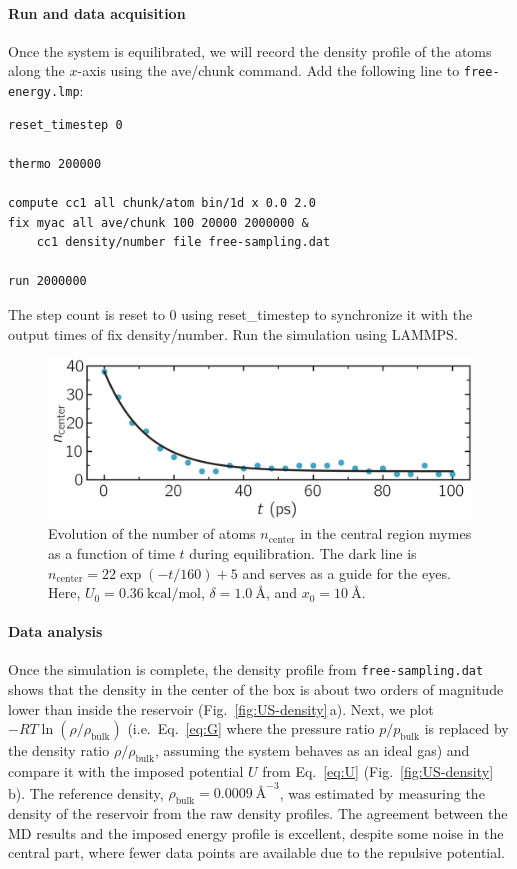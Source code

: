 \documentclass[9pt,tutorial]{livecoms}
\newcommand{\lmpcmd}[1]{\hspace{0pt}\colorbox{listing}{\textcolor{command}{\small{#1}}}\hspace{0pt}} %
\newcommand{\flecmd}[1]{\textcolor{command}{\texttt{#1}}} %
\begin{document}
\paragraph{Run and data acquisition}

Once the system is equilibrated, we will record the density profile of
the atoms along the $x$-axis using the \lmpcmd{ave/chunk} command.
Add the following line to \flecmd{free-energy.lmp}:
\begin{lstlisting}
reset_timestep 0

thermo 200000

compute cc1 all chunk/atom bin/1d x 0.0 2.0
fix myac all ave/chunk 100 20000 2000000 &
    cc1 density/number file free-sampling.dat

run 2000000
\end{lstlisting}
The step count is reset to 0 using \lmpcmd{reset\_timestep} to synchronize it
with the output times of \lmpcmd{fix density/number}.  Run the simulation using
LAMMPS.

\begin{figure}
\centering
\includegraphics[width=\linewidth]{US-density-evolution}
\caption{Evolution of the number of atoms $n_\text{center}$ in the central
region \lmpcmd{mymes} as a function of time $t$ during equilibration.  The dark line
is $n_\text{center} = 22 \exp(-t/160)+5$ and serves as a guide for the eyes.
Here, $U_0 = 0.36~\text{kcal/mol}$, $\delta = 1.0~\text{\AA{}}$, and $x_0 = 10~\text{\AA{}}$.}
\label{fig:US-density-evolution}
\end{figure}

\paragraph{Data analysis}

Once the simulation is complete, the density profile from \flecmd{free-sampling.dat}
shows that the density in the center of the box is
about two orders of magnitude lower than inside the reservoir (Fig.~\ref{fig:US-density}\,a).
Next, we plot $-R T \ln(\rho/\rho_\mathrm{bulk})$ (i.e.~Eq.~\eqref{eq:G} where
the pressure ratio $p/p_\mathrm{bulk}$ is replaced by the density ratio
$\rho/\rho_\mathrm{bulk}$, assuming the system behaves as an ideal gas) and compare it
with the imposed potential $U$ from Eq.~\eqref{eq:U} (Fig.~\ref{fig:US-density}\,b).
The reference density, $\rho_\text{bulk} = 0.0009~\text{\AA{}}^{-3}$,
was estimated by measuring the density of the reservoir from the raw density
profiles.  The agreement between the MD results and the imposed energy profile
is excellent, despite some noise in the central part, where fewer data points
are available due to the repulsive potential.
\end{document}
